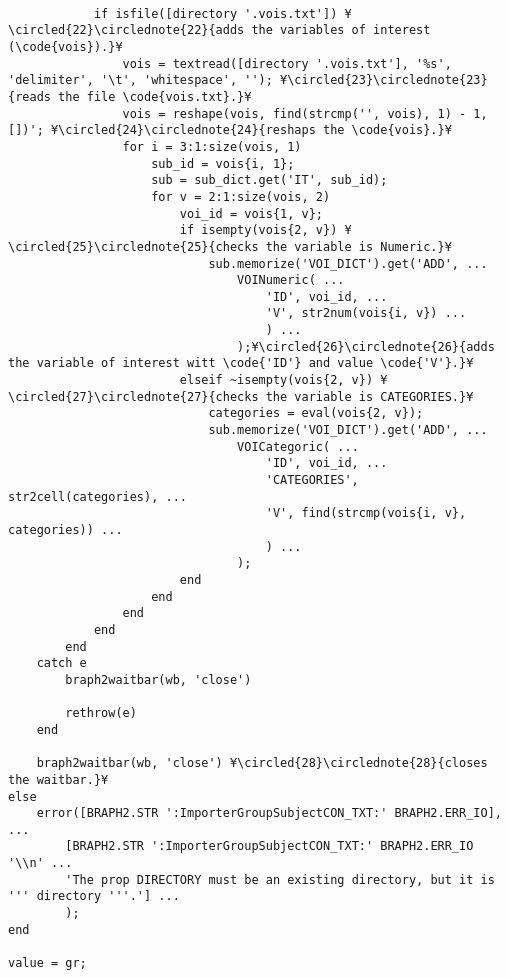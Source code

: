 \documentclass{tufte-handout}
\begin{document}
\begin{lstlisting}
            
            if isfile([directory '.vois.txt']) ¥\circled{22}\circlednote{22}{adds the variables of interest (\code{vois}).}¥
                vois = textread([directory '.vois.txt'], '%s', 'delimiter', '\t', 'whitespace', ''); ¥\circled{23}\circlednote{23}{reads the file \code{vois.txt}.}¥
                vois = reshape(vois, find(strcmp('', vois), 1) - 1, [])'; ¥\circled{24}\circlednote{24}{reshaps the \code{vois}.}¥
                for i = 3:1:size(vois, 1)
                    sub_id = vois{i, 1};
                    sub = sub_dict.get('IT', sub_id);
                    for v = 2:1:size(vois, 2)
                        voi_id = vois{1, v};
                        if isempty(vois{2, v}) ¥\circled{25}\circlednote{25}{checks the variable is Numeric.}¥
                            sub.memorize('VOI_DICT').get('ADD', ...
                                VOINumeric( ...
                                    'ID', voi_id, ...
                                    'V', str2num(vois{i, v}) ...
                                    ) ...
                                );¥\circled{26}\circlednote{26}{adds the variable of interest witt \code{'ID'} and value \code{'V'}.}¥
                        elseif ~isempty(vois{2, v}) ¥\circled{27}\circlednote{27}{checks the variable is CATEGORIES.}¥
                            categories = eval(vois{2, v});
                            sub.memorize('VOI_DICT').get('ADD', ...
                                VOICategoric( ...
                                    'ID', voi_id, ...
                                    'CATEGORIES', str2cell(categories), ...
                                    'V', find(strcmp(vois{i, v}, categories)) ...
                                    ) ...
                                );
                        end                        
                    end
                end
            end
        end
    catch e
        braph2waitbar(wb, 'close')
        
        rethrow(e)
    end
    
	braph2waitbar(wb, 'close') ¥\circled{28}\circlednote{28}{closes the waitbar.}¥
else
    error([BRAPH2.STR ':ImporterGroupSubjectCON_TXT:' BRAPH2.ERR_IO], ...
        [BRAPH2.STR ':ImporterGroupSubjectCON_TXT:' BRAPH2.ERR_IO '\\n' ...
        'The prop DIRECTORY must be an existing directory, but it is ''' directory '''.'] ...
        );
end

value = gr;
\end{lstlisting}
\clearpage
\end{document}
